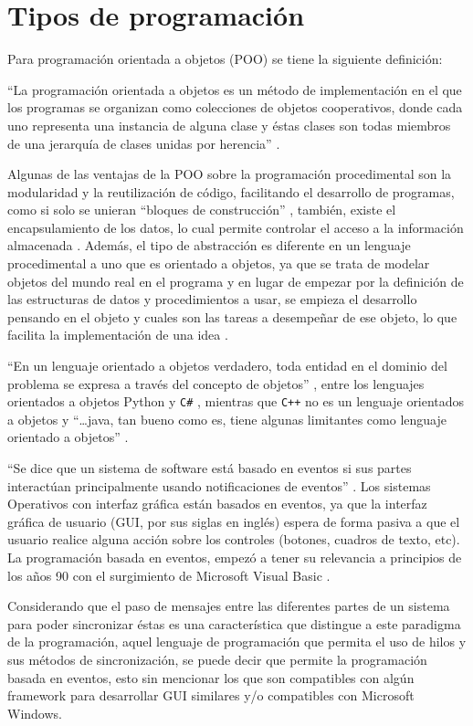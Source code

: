 \section{Tipos de programaci\'on}

Para programaci\'on orientada a objetos (POO) se tiene la siguiente
 definici\'on:


``La programaci\'on orientada a objetos es un m\'etodo de implementaci\'on
 en el que los programas se organizan como colecciones de objetos
 cooperativos,
 donde cada uno representa una instancia de alguna clase y \'estas clases 
 son todas miembros de una jerarqu\'ia de clases unidas por herencia'' 
 \cite{020189551X}.


Algunas de las ventajas de la POO sobre la programaci\'on procedimental
 son la modularidad y la reutilizaci\'on de c\'odigo, facilitando el 
 desarrollo de programas, como si solo se unieran ``bloques de
 construcci\'on'' 
 \cite{020189551X}, tambi\'en, existe el encapsulamiento de los datos, lo 
 cual permite controlar el acceso a la informaci\'on almacenada 
 \cite{8448132467}. Adem\'as, el tipo de abstracci\'on es diferente en 
 un lenguaje procedimental a uno que es orientado a objetos, 
 ya que se trata de modelar objetos del mundo real en el programa y en 
 lugar de empezar por la definici\'on de las estructuras de datos y 
 procedimientos a usar, se empieza el desarrollo pensando en el objeto y 
 cuales son las tareas a desempe\~nar de ese objeto, lo que facilita la 
 implementaci\'on de una idea \cite{8448132467}. 


``En un lenguaje orientado a objetos verdadero, toda entidad en el dominio
 del problema se expresa a trav\'es del concepto de objetos'' 
 \cite{8448132467}, entre los lenguajes orientados a objetos Python
 \cite{MarzalVar2014} y \texttt{C\#} \cite{8448132467}, mientras que
 \texttt{C++} \cite{8448132467} no es un lenguaje orientados a objetos y 
 ``\ldots java, tan bueno como es, tiene algunas limitantes como lenguaje 
 orientado a objetos'' \cite{8448132467}.


``Se dice que un sistema de software est\'a basado en eventos si sus partes
 interact\'uan principalmente usando notificaciones de eventos'' 
 \cite{9781430201564}. Los sistemas Operativos con interfaz gr\'afica est\'an 
 basados en eventos, ya que la interfaz gr\'afica de usuario (GUI, por sus
 siglas en ingl\'es) espera de forma pasiva a que el usuario realice alguna 
 acci\'on sobre los controles \cite{9781430201564} (botones, cuadros de texto, 
 etc). La programaci\'on basada en eventos, empez\'o a tener su relevancia a 
 principios de los a\~nos 90 con el surgimiento de Microsoft Visual Basic 
 \cite{9781430201564}.
 
  
Considerando que el paso de mensajes entre las diferentes partes de un sistema
 para poder sincronizar \'estas \cite{9781430201564} es una caracter\'istica 
 que distingue a este paradigma de la programaci\'on, aquel lenguaje de 
 programaci\'on que permita el uso de hilos y sus m\'etodos de 
 sincronizaci\'on, se puede decir que permite la programaci\'on basada en 
 eventos, esto sin mencionar los que son compatibles con alg\'un framework
 para desarrollar GUI similares y/o compatibles con Microsoft Windows.

